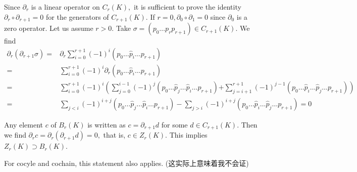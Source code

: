 \documentclass[]{ctexart}
\begin{document}
		Since $\partial_{r}$ is a linear operator on $C_{r}(K),$ it is sufficient to prove the identity $\partial_{r} \circ \partial_{r+1}=0$ for the generators of $C_{r+1}(K) .$ If $r=0, \partial_{0} \circ \partial_{1}=0$ since $\partial_{0}$ is a
		zero operator. Let us assume $r>0 .$ Take $\sigma=\left(p_{0} \ldots p_{r} p_{r+1}\right) \in C_{r+1}(K) $. We find
			\begin{equation*}
			\begin{aligned}
				\partial_{r}\left(\partial_{r+1} \sigma\right)=& \partial_{r} \sum_{i=0}^{r+1}(-1)^{i}\left(p_{0} \ldots \hat{p}_{i} \ldots p_{r+1}\right) \\
				=& \sum_{i=0}^{r+1}(-1)^{i} \partial_{r}\left(p_{0} \ldots \hat{p}_{i} \ldots p_{r+1}\right) \\
				=& \sum_{i=0}^{r+1}(-1)^{i}\left(\sum_{j=0}^{i-1}(-1)^{j}\left(p_{0} \ldots \hat{p}_{j} \ldots \hat{p}_{i} \ldots p_{r+1}\right)\right.\left.+\sum_{j=i+1}^{r+1}(-1)^{j-1}\left(p_{0} \ldots \hat{p}_{i} \ldots \hat{p}_{j} \ldots p_{r+1}\right)\right) \\
				=& \sum_{j<i}(-1)^{i+j}\left(p_{0} \ldots \hat{p}_{j} \ldots \hat{p}_{i} \ldots p_{r+1}\right) -\sum_{j>i}(-1)^{i+j}\left(p_{0} \ldots \hat{p}_{i} \ldots \hat{p}_{j} \ldots p_{r+1}\right)=0
			\end{aligned}
			\end{equation*}
			
		Any element $c$ of $B_{r}(K)$ is written as $c=\partial_{r+1} d$ for some $d \in C_{r+1}(K) .$ Then we find $\partial_{r} c=\partial_{r}\left(\partial_{r+1} d\right)=0,$ that is, $c \in Z_{r}(K) .$ This implies $Z_{r}(K) \supset B_{r}(K)$.
		
		For cocyle and cochain, this statement also applies. (这实际上意味着我不会证)
			
			
\end{document}
